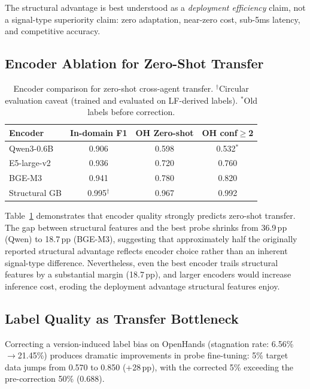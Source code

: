 \documentclass[11pt,a4paper]{article}
\begin{document}
The structural advantage is best understood as a \emph{deployment efficiency} claim, not a signal-type superiority claim: zero adaptation, near-zero cost, sub-5ms latency, and competitive accuracy.

\subsection{Encoder Ablation for Zero-Shot Transfer}

\begin{table}[t]
\centering
\small
\begin{tabular}{lccc}
\toprule
\textbf{Encoder} & \textbf{In-domain F1} & \textbf{OH Zero-shot} & \textbf{OH conf$\geq$2} \\
\midrule
Qwen3-0.6B & 0.906 & 0.598 & 0.532$^*$ \\
E5-large-v2 & 0.936 & 0.720 & 0.760 \\
BGE-M3 & 0.941 & 0.780 & 0.820 \\
Structural GB & 0.995$^\dagger$ & 0.967 & 0.992 \\
\bottomrule
\end{tabular}
\caption{Encoder comparison for zero-shot cross-agent transfer. $^\dagger$Circular evaluation caveat (trained and evaluated on LF-derived labels). $^*$Old labels before correction.}
\label{tab:encoder}
\end{table}

Table~\ref{tab:encoder} demonstrates that encoder quality strongly predicts zero-shot transfer.
The gap between structural features and the best probe shrinks from 36.9\,pp (Qwen) to 18.7\,pp (BGE-M3), suggesting that approximately half the originally reported structural advantage reflects encoder choice rather than an inherent signal-type difference.
Nevertheless, even the best encoder trails structural features by a substantial margin (18.7\,pp), and larger encoders would increase inference cost, eroding the deployment advantage structural features enjoy.

\subsection{Label Quality as Transfer Bottleneck}

Correcting a version-induced label bias on OpenHands (stagnation rate: 6.56\%$\to$21.45\%) produces dramatic improvements in probe fine-tuning: 5\% target data jumps from 0.570 to 0.850 (+28\,pp), with the corrected 5\% exceeding the pre-correction 50\% (0.688).
\end{document}
